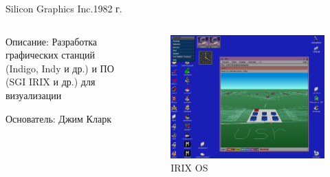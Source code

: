 \documentclass{beamer}
\begin{document}
\begin{frame}{Silicon Graphics Inc.}{1982 г.}
	\begin{columns}
		\begin{column}{0.5\textwidth}
			
			Описание: Разработка графических станций (Indigo, Indy и др.) и ПО (SGI IRIX и др.) для визуализации
			
			Основатель: Джим Кларк
			
		\end{column}
		\begin{column}{0.5\textwidth}
			\begin{figure} 
				\includegraphics[width=\textwidth]{images/IRIX_OS.png}
				\caption {IRIX OS}
			\end{figure}
		\end{column}
	\end{columns}
\end{frame}
\end{document}
